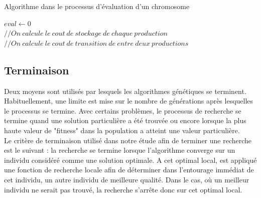 \documentclass[12pt,a4paper]{article}
\begin{document}
	\begin{algorithm}[H]
 		\caption{Algorithme dans le processus d'évaluation d'un chromosome}
 		\label{alg:evaluation}
 		\BlankLine
 		$eval \gets 0$\\
 		$// On\ calcule\ le\ cout\ de\ stockage\ de\ chaque\ production$ \\
 		$// On\ calcule\ le\ cout\ de\ transition\ de\ entre\ deux\ productions$ \\
	\end{algorithm}
	
	\subsection{Terminaison}
	Deux moyens sont utilisés par lesquels les algorithmes génétiques se terminent. Habituellement, une limite est mise sur le nombre de générations après lesquelles le processus se termine. Avec certains problèmes, le processus de recherche se termine quand une solution particulière a été trouvée ou encore lorsque la plus haute valeur de "fitness" dans la population a atteint une valeur particulière. \\
	\hspace*{.5cm} Le critère de terminaison utilisé dans notre étude afin de terminer une recherche est le suivant : la recherche se termine lorsque l'algorithme converge sur un individu considéré comme une solution optimale. A cet optimal local, est appliqué une fonction de recherche locale afin de déterminer dans l'entourage immédiat de cet individu, un autre individu de meilleure qualité. Dans le cas, où un meilleur individu ne serait pas trouvé, la recherche s’arrête donc sur cet optimal local.
	
\end{document}
